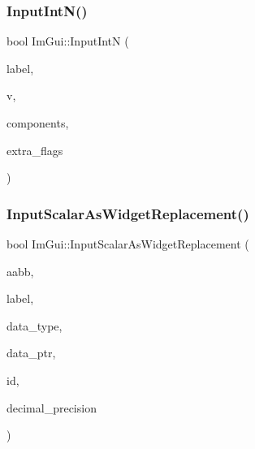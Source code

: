 \hypertarget{namespace_im_gui_a9b9aaec8d095156b74ee191b532fa137}{}\label{namespace_im_gui_a9b9aaec8d095156b74ee191b532fa137} 
\subsubsection{\texorpdfstring{Input\+Int\+N()}{InputIntN()}}
{\footnotesize\ttfamily bool Im\+Gui\+::\+Input\+IntN (\begin{DoxyParamCaption}\item[{const char $\ast$}]{label,  }\item[{int $\ast$}]{v,  }\item[{int}]{components,  }\item[{Im\+Gui\+Input\+Text\+Flags}]{extra\+\_\+flags }\end{DoxyParamCaption})}

\hypertarget{namespace_im_gui_a9b7223f54687d740a5961d7f278e01ef}{}\label{namespace_im_gui_a9b7223f54687d740a5961d7f278e01ef} 
\subsubsection{\texorpdfstring{Input\+Scalar\+As\+Widget\+Replacement()}{InputScalarAsWidgetReplacement()}}
{\footnotesize\ttfamily bool Im\+Gui\+::\+Input\+Scalar\+As\+Widget\+Replacement (\begin{DoxyParamCaption}\item[{const \hyperlink{struct_im_rect}{Im\+Rect} \&}]{aabb,  }\item[{const char $\ast$}]{label,  }\item[{Im\+Gui\+Data\+Type}]{data\+\_\+type,  }\item[{void $\ast$}]{data\+\_\+ptr,  }\item[{Im\+Gui\+ID}]{id,  }\item[{int}]{decimal\+\_\+precision }\end{DoxyParamCaption})}

\hypertarget{namespace_im_gui_a08c243542b1678859cf0e065f9e43865}{}\label{namespace_im_gui_a08c243542b1678859cf0e065f9e43865} 
